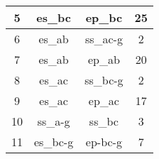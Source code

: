 \documentclass[conference]{IEEEtran}
\begin{document}
\begin{table}[htp]
\begin{tabular}{|c|c|c|c|}
5                                                            & es\_bc                                                                & ep\_bc                                                                   & 25                                                                                                                           \\ \hline
6                                                            & es\_ab                                                                & ss\_ac-g                                                                 & 2                                                                                                                            \\ \hline
7                                                            & es\_ab                                                                & ep\_ab                                                                   & 20                                                                                                                           \\ \hline
8                                                            & es\_ac                                                                & ss\_bc-g                                                                 & 2                                                                                                                            \\ \hline
9                                                            & es\_ac                                                                & ep\_ac                                                                   & 17                                                                                                                           \\ \hline
10                                                           & ss\_a-g                                                               & ss\_bc                                                                   & 3                                                                                                                            \\ \hline
11                                                           & es\_bc-g                                                              & ep-bc-g                                                                  & 7                                                                                                                            \\ \hline

\end{tabular}
\end{table}
\end{document}
